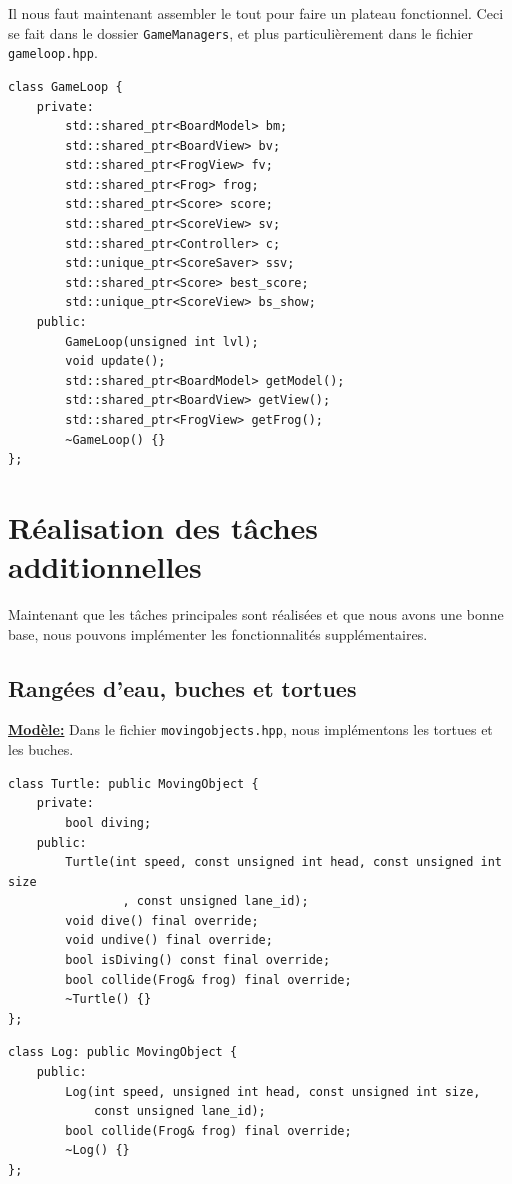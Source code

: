 \documentclass[a4paper, 12pt]{article}
\begin{document}
Il nous faut maintenant assembler le tout pour faire un plateau fonctionnel. 
Ceci se fait dans le dossier \texttt{GameManagers}, et plus particulièrement 
dans le fichier \texttt{gameloop.hpp}. 

\begin{lstlisting}
class GameLoop {
    private:
        std::shared_ptr<BoardModel> bm;
        std::shared_ptr<BoardView> bv;
        std::shared_ptr<FrogView> fv;
        std::shared_ptr<Frog> frog;
        std::shared_ptr<Score> score;
        std::shared_ptr<ScoreView> sv;
        std::shared_ptr<Controller> c;
        std::unique_ptr<ScoreSaver> ssv;
        std::shared_ptr<Score> best_score;
        std::unique_ptr<ScoreView> bs_show;
    public:
        GameLoop(unsigned int lvl);
        void update();
        std::shared_ptr<BoardModel> getModel();
        std::shared_ptr<BoardView> getView();
        std::shared_ptr<FrogView> getFrog();
        ~GameLoop() {}
};
\end{lstlisting}

\section{Réalisation des tâches additionnelles}
Maintenant que les tâches principales sont réalisées et que nous avons une bonne base, nous pouvons implémenter les fonctionnalités supplémentaires. 

\subsection{Rangées d'eau, buches et tortues} \label{turtle_class}

\underline{\textbf{Modèle:}} 
Dans le fichier \texttt{movingobjects.hpp}, nous implémentons les tortues et les buches. 

\begin{lstlisting}
class Turtle: public MovingObject {
    private:
        bool diving;
    public:
        Turtle(int speed, const unsigned int head, const unsigned int size
                , const unsigned lane_id);
        void dive() final override;
        void undive() final override;
        bool isDiving() const final override;
        bool collide(Frog& frog) final override;
        ~Turtle() {}
};
\end{lstlisting}

\begin{lstlisting}
class Log: public MovingObject {
    public:
        Log(int speed, unsigned int head, const unsigned int size,
            const unsigned lane_id);
        bool collide(Frog& frog) final override;
        ~Log() {}
};
\end{lstlisting} \hspace{0.5cm}
\end{document}
